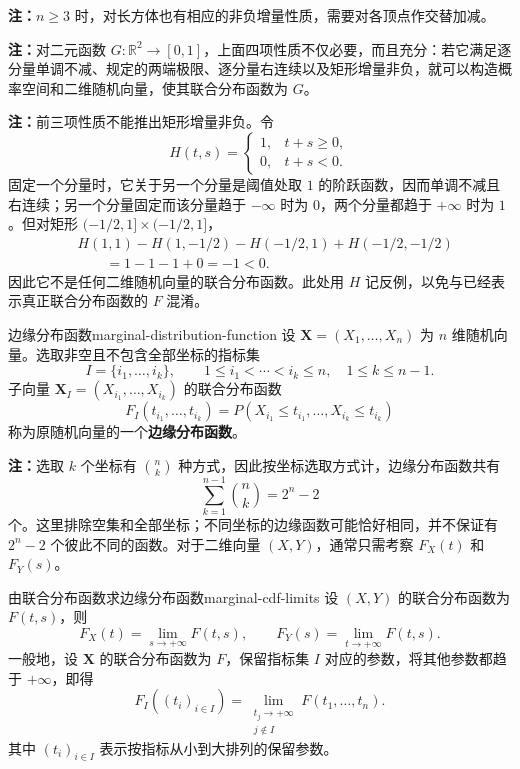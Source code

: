 \textbf{注：}\quad $n\geq3$ 时，对长方体也有相应的非负增量性质，需要对各顶点作交替加减。

\textbf{注：}\quad 对二元函数 $G:\mathbb R^2\to[0,1]$，上面四项性质不仅必要，而且充分：若它满足逐分量单调不减、规定的两端极限、逐分量右连续以及矩形增量非负，就可以构造概率空间和二维随机向量，使其联合分布函数为 $G$。

\textbf{注：}\quad 前三项性质不能推出矩形增量非负。令
\[
H(t,s)=
\begin{cases}
1,&t+s\geq0,\\
0,&t+s<0.
\end{cases}
\]
固定一个分量时，它关于另一个分量是阈值处取 $1$ 的阶跃函数，因而单调不减且右连续；另一个分量固定而该分量趋于 $-\infty$ 时为 $0$，两个分量都趋于 $+\infty$ 时为 $1$。但对矩形 $(-1/2,1]\times(-1/2,1]$，
\begin{align*}
&H(1,1)-H(1,-1/2)-H(-1/2,1)+H(-1/2,-1/2)\\
&\qquad=1-1-1+0=-1<0.
\end{align*}
因此它不是任何二维随机向量的联合分布函数。此处用 $H$ 记反例，以免与已经表示真正联合分布函数的 $F$ 混淆。

\begin{mydefinition}{边缘分布函数}{marginal-distribution-function}
设 $\boldsymbol X=(X_1,\ldots,X_n)$ 为 $n$ 维随机向量。选取非空且不包含全部坐标的指标集
\[
I=\{i_1,\ldots,i_k\},\qquad
1\leq i_1<\cdots<i_k\leq n,\quad 1\leq k\leq n-1.
\]
子向量 $\boldsymbol X_I=(X_{i_1},\ldots,X_{i_k})$ 的联合分布函数
\[
F_I(t_{i_1},\ldots,t_{i_k})
=P(X_{i_1}\leq t_{i_1},\ldots,X_{i_k}\leq t_{i_k})
\]
称为原随机向量的一个\textbf{边缘分布函数}。
\end{mydefinition}

\textbf{注：}\quad 选取 $k$ 个坐标有 $\binom nk$ 种方式，因此按坐标选取方式计，边缘分布函数共有
\[
\sum_{k=1}^{n-1}\binom nk=2^n-2
\]
个。这里排除空集和全部坐标；不同坐标的边缘函数可能恰好相同，并不保证有 $2^n-2$ 个彼此不同的函数。对于二维向量 $(X,Y)$，通常只需考察 $F_X(t)$ 和 $F_Y(s)$。

\begin{proposition}{由联合分布函数求边缘分布函数}{marginal-cdf-limits}
设 $(X,Y)$ 的联合分布函数为 $F(t,s)$，则
\[
F_X(t)=\lim_{s\to+\infty}F(t,s),\qquad
F_Y(s)=\lim_{t\to+\infty}F(t,s).
\]
一般地，设 $\boldsymbol X$ 的联合分布函数为 $F$，保留指标集 $I$ 对应的参数，将其他参数都趋于 $+\infty$，即得
\[
F_I((t_i)_{i\in I})
=\lim_{\substack{t_j\to+\infty\\j\notin I}}F(t_1,\ldots,t_n).
\]
其中 $(t_i)_{i\in I}$ 表示按指标从小到大排列的保留参数。
\end{proposition}

